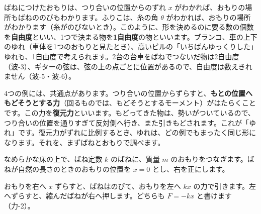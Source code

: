 ばねにつけたおもりは、つり合いの位置からのずれ $x$ がわかれば、おもりの場所もばねののびもわかります。ふりこは、糸の角 $\theta$ がわかれば、おもりの場所がわかります（糸がのびないとき）。このように、形を決めるのに要る数の個数を\textbf{自由度}といい、1つで決まる物を\textbf{1自由度}の物といいます。ブランコ、車の上下のゆれ（車体を1つのおもりと見たとき）、高いビルの「いちばんゆっくりした」ゆれも、1自由度で考えられます。2台の台車をばねでつないだ物は2自由度（波-3）、ギターの弦は、弦の上の点ごとに位置があるので、自由度は数えきれません（波-5・波-6）。

4つの例には、共通点があります。つり合いの位置からずらすと、\textbf{もとの位置へもどそうとする力}（回るものでは、もどそうとするモーメント）がはたらくことです。この力を\textbf{復元力}といいます。もどってきた物は、勢いがついているので、つり合いの位置を通りすぎて反対側へ行き、また引きもどされます。これが「ゆれ」です。復元力がずれに比例するとき、ゆれは、どの例でもまったく同じ形になります。それを、まずばねとおもりで調べます。

\label{ph:波-1:sec2}
\noindent\begin{minipage}[c]{0.46\linewidth}\centering
{}
\end{minipage}\hfill
\begin{minipage}[c]{0.51\linewidth}\raggedright
なめらかな床の上で、ばね定数 $k$ のばねに、質量 $m$ のおもりをつなぎます。ばねが自然の長さのときのおもりの位置を $x=0$ とし、右を正にします。\par\vspace{2pt}
おもりを右へ $x$ ずらすと、ばねはのびて、おもりを左へ $kx$ の力で引きます。左へずらすと、縮んだばねが右へ押します。どちらも $F=-kx$ と書けます（力-2）。
\end{minipage}

